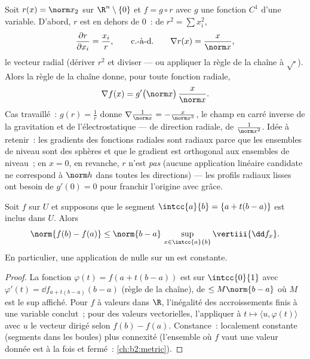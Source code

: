 \begin{example}\label{ex:b2:diffcalc:radial}
Soit $r(x) = \norm x_2$ sur $\R^n\setminus\{0\}$ et $f = g \circ
r$ avec $g$ une fonction $C^1$ d'une variable. D'abord, $r$ est
 en dehors de $0$~: de $r^2 = \sum x_i^2$,
\[
\frac{\partial r}{\partial x_i} = \frac{x_i}{r},
\qquad\text{c.-à-d.}\qquad
\nabla r(x) = \frac{x}{\norm x} ,
\]
le vecteur radial  (dériver $r^2$ et diviser --- ou
appliquer la règle de la chaîne à $\sqrt{\cdot}$). Alors la règle de
la chaîne donne, pour toute fonction radiale,
\[
\nabla f(x) = g'\bigl(\norm x\bigr)\,\frac{x}{\norm x} .
\]
Cas travaillé~: $g(r) = \frac1r$ donne $\nabla\frac{1}{\norm
x} = -\frac{x}{\norm x^3}$, le champ en carré inverse de la
gravitation et de l'électrostatique --- de direction radiale, de
 $\frac{1}{\norm x^2}$. Idée à retenir~: les gradients des
fonctions radiales sont radiaux parce que les ensembles de niveau
sont des sphères et que le gradient est orthogonal aux ensembles de
niveau~; en $x = 0$, en revanche, $r$ n'est \emph{pas}
 (aucune application linéaire candidate ne correspond
à $\norm h$ dans toutes les directions) --- les profils radiaux
lisses ont besoin de $g'(0) = 0$ pour franchir l'origine avec grâce.
\end{example}

\begin{theorem}\label{thm:b2:diffcalc:mvi}
Soit $f$  sur $U$ et supposons que le segment
$\intcc{a}{b} = \{a + t(b-a)\}$ est inclus dans $U$. Alors
\[
\norm{f(b) - f(a)} \leq \norm{b - a}\,
\sup_{x \in \intcc{a}{b}} \vertiii{\dd f_x} .
\]
En particulier, une application  de 
nulle sur un  \emph{} est constante.
\end{theorem}

\begin{proof}
La fonction $\varphi(t) = f(a + t(b-a))$ est  sur
$\intcc{0}{1}$ avec $\varphi'(t) = \dd f_{a + t(b-a)}(b - a)$
(règle de la chaîne), de  $\leq M\norm{b-a}$ où $M$ est le sup
affiché. Pour $f$ à valeurs dans $\R$, l'inégalité des accroissements
finis à une variable conclut~; pour des valeurs vectorielles,
l'appliquer à $t \mapsto \langle u, \varphi(t)\rangle$ avec $u$ le
vecteur  dirigé selon $f(b) - f(a)$. Constance~: localement
constante (segments dans les boules) plus connexité (l'ensemble où
$f$ vaut une valeur donnée est à la fois  et fermé~:
\cref{ch:b2:metric}).
\end{proof}

